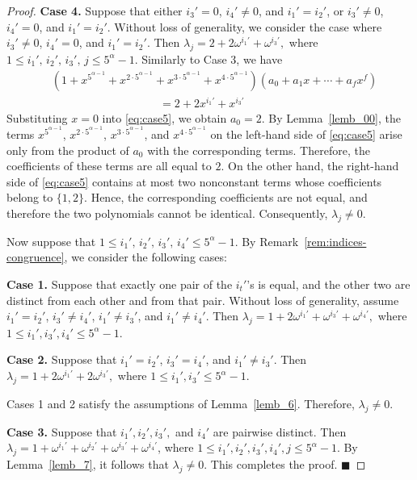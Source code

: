 \documentclass[12pt]{article}
\begin{document}
\begin{proof}
\textbf{Case 4.} Suppose that either $i_3'=0$, $i_4'\neq0$, and $i_1'= i_2'$, or $i_3'\neq0$, $i_4'=0$, and $i_1'= i_2'$. Without loss of generality, we consider the case where $i_3'\neq0$, $i_4'=0$, and $i_1'= i_2'$. Then
$
\lambda_j=2+2\omega^{i_1'}+\omega^{i_3'},
$
where $1\le i_1',\,i_2',\,i_3',\,j\le5^\alpha-1$. Similarly to Case 3, we have
\begin{equation}\label{eq:case5}
	\begin{aligned}
		&\left(1+x^{5^{\alpha-1}}+x^{2\cdot5^{\alpha-1}}+x^{3\cdot5^{\alpha-1}}+x^{4\cdot5^{\alpha-1}}\right)
		\left(a_0+a_1x+\cdots+a_fx^f\right)\\
		&\hspace{4cm}=2+2x^{i_1'}+x^{i_3'}
	\end{aligned}
\end{equation} 	
Substituting $x=0$ into \eqref{eq:case5}, we obtain $a_0=2$. By Lemma~\ref{lemb_00}, the terms $x^{5^{\alpha-1}}$, $x^{2\cdot5^{\alpha-1}}$, $x^{3\cdot5^{\alpha-1}}$, and $x^{4\cdot5^{\alpha-1}}$ on the left-hand side of \eqref{eq:case5} arise only from the product of $a_0$ with the corresponding terms. Therefore, the coefficients of these terms are all equal to $2$. On the other hand, the right-hand side of \eqref{eq:case5} contains at most two nonconstant terms whose coefficients belong to $\{1,2\}$. Hence, the corresponding coefficients are not equal, and therefore the two polynomials cannot be identical. Consequently, $\lambda_j\neq0$.

Now suppose that $1\le i_1',\,i_2',\,i_3',\,i_4'\le5^\alpha-1$. By Remark~\ref{rem:indices-congruence}, we consider the following cases:

\textbf{Case 1.}
Suppose that exactly one pair of the $i_t'$'s is equal, and the other two are distinct from each other and from that pair. Without loss of generality, assume $i_1'=i_2'$, $i_3'\neq i_4'$, $i_1'\neq i_3'$, and $i_1'\neq i_4'$. Then
$
\lambda_j=1+2\omega^{i_1'}+\omega^{i_3'}+\omega^{i_4'},
$
where $1\le i_1',i_3',i_4'\le 5^\alpha-1$.

\medskip

\textbf{Case 2.}
Suppose that $i_1'=i_2'$, $i_3'=i_4'$, and $i_1'\neq i_3'$. Then
$
\lambda_j=1+2\omega^{i_1'}+2\omega^{i_3'},
$
where $1\le i_1',i_3'\le 5^\alpha-1$.
\medskip

\noindent Cases 1 and 2 satisfy the assumptions of Lemma~\ref{lemb_6}. Therefore, $\lambda_j\neq0$.

\textbf{Case 3.}
Suppose that $i_1', i_2', i_3',$ and $i_4'$ are pairwise distinct. Then 	$
\lambda_j=1+\omega^{i_1'}+\omega^{i_2'}+\omega^{i_3'}+\omega^{i_4'}
$, where 	$
1\le i_1',i_2',i_3',i_4',j\le5^\alpha-1
$. By Lemma~\ref{lemb_7}, it follows that $\lambda_j\neq 0$.  This completes the proof.
\hfill$\blacksquare$
  \end{proof}
\end{document}
